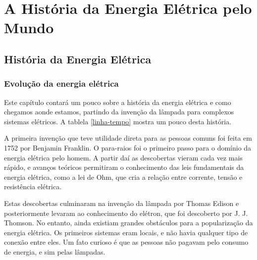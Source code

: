 \section{A História da Energia Elétrica pelo Mundo}

\subsection{História da Energia Elétrica}


\subsubsection{Evolução da energia elétrica}

Este capítulo contará um pouco sobre a história da energia elétrica e como chegamos aonde estamos, partindo da invenção da lâmpada para complexos sistemas elétricos. A tablela \ref{linha-tempo} mostra um pouco desta história.

A primeira invenção que teve utilidade direta para as pessoas comuns foi feita em 1752 por Benjamin Franklin. O para-raios foi o primeiro passo para o domínio da energia elétrica pelo homem. A partir daí as descobertas vieram cada vez mais rápido, e avanços teóricos permitiram o conhecimento das leis fundamentais da energia elétrica, como a lei de Ohm, que cria a relação entre corrente, tensão e resistência elétrica.

Estas descobertas culminaram na invenção da lâmpada por Thomas Edison e posteriormente levaram ao conhecimento do elétron, que foi descoberto por J. J. Thomson. No entanto, ainda existiam grandes obstáculos para a popularização da energia elétrica. Os primeiros sistemas eram locais, e não havia qualquer tipo de conexão entre eles. Um fato curioso é que as pessoas não pagavam pelo consumo de energia, e sim pelas lâmpadas. 



